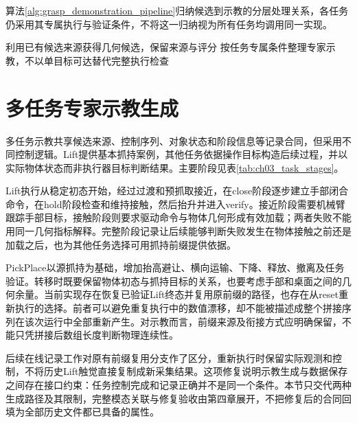 算法\ref{alg:grasp_demonstration_pipeline}归纳候选到示教的分层处理关系，各任务仍采用其专属执行与验证条件，不将这一归纳视为所有任务均调用同一实现。
\begin{algorithm}[H]
\small
\caption{抓取候选筛选与专家示教验证流程}\label{alg:grasp_demonstration_pipeline}
利用已有候选来源获得几何候选，保留来源与评分\;
按任务专属条件整理专家示教，不以单目标可达替代完整执行检查\;
\end{algorithm}

\section{多任务专家示教生成}
\label{sec:multitask_demonstration}

多任务示教共享候选来源、控制序列、对象状态和阶段信息等记录合同，但采用不同控制逻辑。Lift提供基本抓持案例，其他任务依据操作目标构造后续过程，并以实际物体状态而非执行器目标判断结果。主要阶段见表\ref{tab:ch03_task_stages}。

Lift执行从稳定初态开始，经过过渡和预抓取接近，在close阶段逐步建立手部闭合命令，在hold阶段检查和维持接触，然后抬升并进入verify。接近阶段需要机械臂跟踪手部目标，接触阶段则要求驱动命令与物体几何形成有效加载；两者失败不能用同一几何指标解释。完整阶段记录让后续能够判断失败发生在物体接触之前还是加载之后，也为其他任务选择可用抓持前缀提供依据。

PickPlace以源抓持为基础，增加抬高避让、横向运输、下降、释放、撤离及任务验证。转移时既要保留物体初态与抓持目标的关系，也要考虑手部和桌面之间的几何余量。当前实现存在恢复已验证Lift终态并复用原前缀的路径，也存在从reset重新执行的选择。前者可以避免重复执行中的数值漂移，却不能被描述成整个拼接序列在该次运行中全部重新产生。对示教而言，前缀来源及衔接方式应明确保留，不能只凭拼接后数组长度判断物理连续性。

后续在线记录工作对原有前缀复用分支作了区分，重新执行时保留实际观测和控制，不将历史Lift触觉直接复制成新采集结果。这项修复说明示教生成与数据保存之间存在接口约束：任务控制完成和记录正确并不是同一个条件。本节只交代两种生成路径及其限制，完整模态关联与修复验收由第四章展开，不把修复后的合同回填为全部历史文件都已具备的属性。

